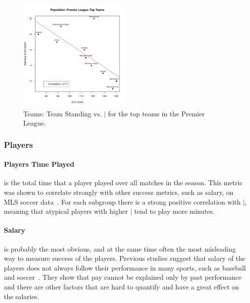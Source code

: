 		\begin{figure}[t]
			\centering
			\includegraphics[width=0.5\textwidth]{NewPlotsJan2016/topTeamStats-Sep.pdf}
			
			\caption{Teams: Team Standing vs. $\mid$ for the top teams in the Premier League. 
				\label{fig:TeamStandingELD}}
		\end{figure}
		
		\subsubsection{Players}
		
		\paragraph{Players Time Played} is the total time that a player played over all matches in the season. This metric was shown to correlate strongly with other success metrics, such as salary, on MLS soccer data~\cite{schwartz}. 
		For each subgroup there is a strong positive correlation with $\mid$, meaning that atypical players with higher $\mid$ tend to play more minutes.
		
		\paragraph{Salary} is probably the most obvious, and at the same time often the most misleading way to measure success of the players. Previous studies suggest that salary of the players does not  always follow their performance in many sports, such as baseball and soccer~\cite{Hall2002,Barrio2004}. They show that pay cannot be explained only by past performance and there are other factors that are hard to quantify and have a great effect on the salaries. 
		
